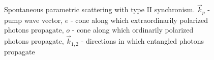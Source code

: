 \begin{figure}
\centering


\caption{Spontaneous parametric scattering with type II synchronism.
  $\vec{k}_p$ - pump wave vector, $e$ - cone
  along which extraordinarily polarized photons propagate,
  $o$ - cone along which ordinarily polarized photons propagate,
  $\vec{k}_{1,2}$ -
  directions in which entangled photons propagate}
\label{figEntangGen}
\end{figure}